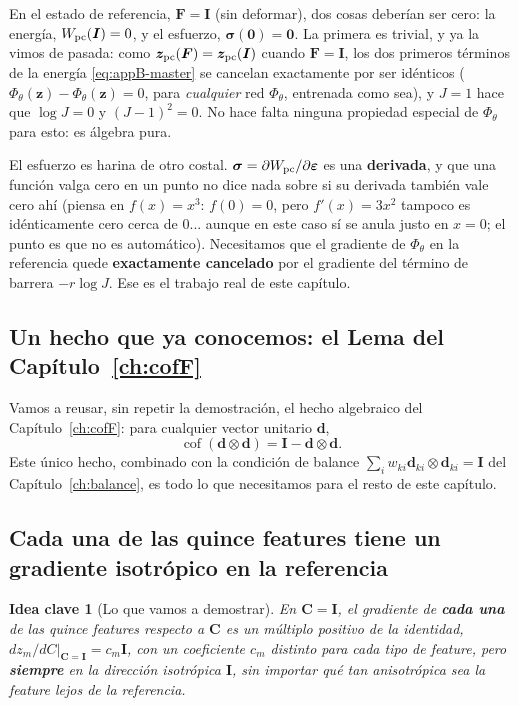 \documentclass[11pt,a4paper]{article}
\newtheorem{takeaway}{Idea clave}
\newcommand{\Cof}{\operatorname{cof}}
\begin{document}
En el estado de referencia, $\bm F=\bm I$ (sin deformar), dos cosas
deber\'ian ser cero: la energ\'ia, $W_{\rm pc}(\bm I)=0$, y el
esfuerzo, $\bm\sigma(\bm0)=\bm0$. La primera es trivial, y ya la vimos
de pasada: como $\bm z_{\rm pc}(\bm F)=\bm z_{\rm pc}(\bm I)$ cuando
$\bm F=\bm I$, los dos primeros t\'erminos de la energ\'ia
\eqref{eq:appB-master} se cancelan exactamente por ser id\'enticos
($\Phi_\theta(\bm z)-\Phi_\theta(\bm z)=0$, para \emph{cualquier} red
$\Phi_\theta$, entrenada como sea), y $J=1$ hace que $\log J=0$ y
$(J-1)^2=0$. No hace falta ninguna propiedad especial de $\Phi_\theta$
para esto: es \'algebra pura.

El esfuerzo es harina de otro costal. $\bm\sigma=\partial
W_{\rm pc}/\partial\bm\varepsilon$ es una \textbf{derivada}, y que una
funci\'on valga cero en un punto no dice nada sobre si su derivada
tambi\'en vale cero ah\'i (piensa en $f(x)=x^3$: $f(0)=0$, pero
$f'(x)=3x^2$ tampoco es id\'enticamente cero cerca de $0$... aunque en
este caso s\'i se anula justo en $x=0$; el punto es que no es
autom\'atico). Necesitamos que el gradiente de $\Phi_\theta$ en la
referencia quede \textbf{exactamente cancelado} por el gradiente del
t\'ermino de barrera $-r\log J$. Ese es el trabajo real de este
cap\'itulo.

\subsection{Un hecho que ya conocemos: el Lema del Cap\'itulo~\ref{ch:cofF}}

Vamos a reusar, sin repetir la demostraci\'on, el hecho algebraico del
Cap\'itulo~\ref{ch:cofF}: para cualquier vector unitario $\bm d$,
\begin{equation}
 \Cof(\bm d\otimes\bm d)=\bm I-\bm d\otimes\bm d.
 \label{eq:appB-lemma-recall}
\end{equation}
Este \'unico hecho, combinado con la condici\'on de balance
$\sum_iw_{ki}\bm d_{ki}\otimes\bm d_{ki}=\bm I$ del
Cap\'itulo~\ref{ch:balance}, es todo lo que necesitamos para el resto
de este cap\'itulo.

\subsection{Cada una de las quince features tiene un gradiente isotr\'opico en la referencia}
\label{sec:appB-prop1}

\begin{takeaway}[Lo que vamos a demostrar]
En $\bm C=\bm I$, el gradiente de \textbf{cada una} de las quince
features respecto a $\bm C$ es un m\'ultiplo positivo de la identidad,
$dz_m/dC|_{\bm C=\bm I}=c_m\bm I$, con un coeficiente $c_m$ distinto
para cada tipo de feature, pero \textbf{siempre} en la direcci\'on
isotr\'opica $\bm I$, sin importar qu\'e tan anisotr\'opica sea la
feature lejos de la referencia.
\end{takeaway}
\end{document}
